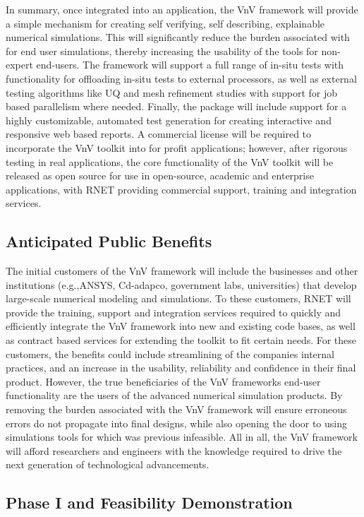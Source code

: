 In summary, once integrated into an application, the VnV framework will provide a simple mechanism for creating self verifying, self describing, explainable numerical simulations. This will significantly reduce the burden associated with \VV for end user simulations, thereby increasing the usability of the tools for non-expert end-users. The framework will support a full range of in-situ \VV tests with functionality for offloading in-situ tests to external processors, as well as external \VV testing algorithms like UQ and mesh refinement studies with support for job based parallelism where needed. Finally, the package will include support for a highly customizable, automated \VV test generation for creating interactive and responsive web based \VV reports. A commercial license will be required to incorporate the VnV toolkit into for profit applications; however, after rigorous testing in real applications, the core functionality of the VnV toolkit will be released as open source for use in open-source, academic and enterprise applications, with RNET providing commercial support, training and integration services. 



\subsection{Anticipated Public Benefits}

The initial customers of the VnV framework will include the businesses and other institutions (e.g.,ANSYS, Cd-adapco, government labs, universities) that develop large-scale numerical modeling and simulations. To these customers, RNET will provide the training, support and integration services required to quickly and efficiently integrate the VnV framework into new and existing code bases, as well as contract based services for extending the toolkit to fit certain needs. For these customers, the benefits could include streamlining of the companies internal \VV practices, and an increase in the usability, reliability and confidence in their 
final product. However, the true beneficiaries of the VnV frameworks end-user \VV functionality are the users of the advanced numerical simulation products. By removing the burden associated with
\VV the VnV framework will ensure erroneous errors do not propagate into final designs, while also opening the door to using simulations tools for which \VV was previous infeasible. All in all, the VnV framework will 
afford researchers and engineers with the knowledge required to drive the next generation of technological advancements. 

\subsection{Phase I and Feasibility Demonstration}
